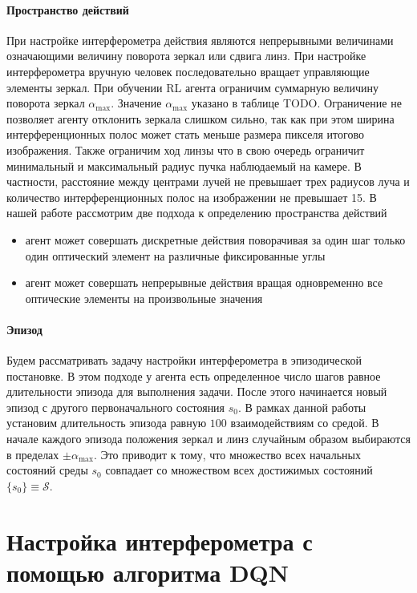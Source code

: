 \paragraph{Пространство действий}
При настройке интерферометра действия являются непрерывными величинами означающими величину поворота зеркал или сдвига линз. При настройке интерферометра вручную человек последовательно вращает управляющие элементы зеркал. При обучении RL агента ограничим суммарную величину поворота зеркал $\alpha_{\max}$. Значение $\alpha_{\max}$ указано в таблице TODO. Ограничение не позволяет агенту отклонить зеркала слишком сильно, так как при этом ширина интерференционных полос может стать меньше размера пикселя итогово изображения. Также ограничим ход линзы что в свою очередь ограничит минимальный и максимальный радиус пучка наблюдаемый на камере. В частности, расстояние между центрами лучей не превышает трех радиусов луча и количество интерференционных полос на изображении не превышает 15. В нашей работе рассмотрим две подхода к определению пространства действий

\begin{itemize}
    \item агент может совершать дискретные действия поворачивая за один шаг только один оптический элемент на различные фиксированные углы
    \item агент может совершать непрерывные действия вращая одновременно все оптические элементы на произвольные значения
\end{itemize}

\paragraph{Эпизод}
Будем рассматривать задачу настройки интерферометра в эпизодической постановке. В этом подходе у агента есть определенное число шагов равное длительности эпизода для выполнения задачи. После этого начинается новый эпизод с другого первоначального состояния $s_0$. В рамках данной работы установим длительность эпизода равную $100$ взаимодействиям со средой. В начале каждого эпизода положения зеркал и линз случайным образом выбираются в пределах  $\pm\alpha_{\max}$. Это приводит к тому, что множество всех начальных состояний среды $s_0$ совпадает со множеством всех достижимых состояний $\{s_0\} \equiv \mathcal{S}$. 


\section{Настройка интерферометра с помощью алгоритма DQN}\label{sec:ch2/sec3}

